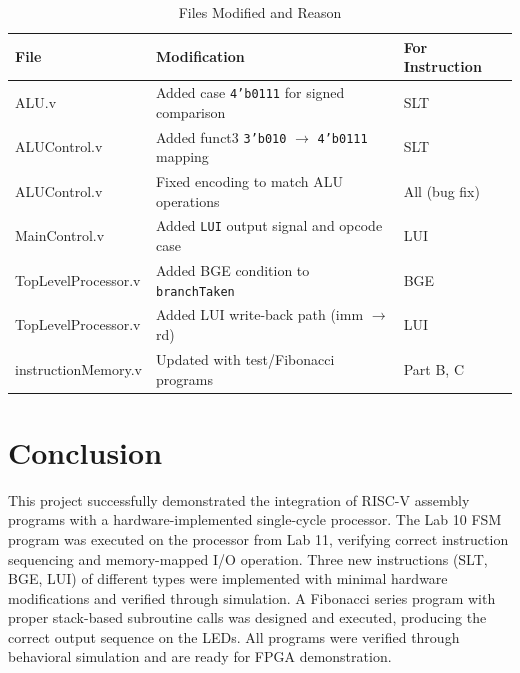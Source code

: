 \documentclass[12pt,a4paper]{article}
\begin{document}
\begin{table}[h]
\centering
\caption{Files Modified and Reason}
\begin{tabular}{@{}lll@{}}
\toprule
\textbf{File} & \textbf{Modification} & \textbf{For Instruction} \\
\midrule
ALU.v              & Added case \texttt{4'b0111} for signed comparison & SLT \\
ALUControl.v       & Added funct3 \texttt{3'b010} $\rightarrow$ \texttt{4'b0111} mapping & SLT \\
ALUControl.v       & Fixed encoding to match ALU operations & All (bug fix) \\
MainControl.v      & Added \texttt{LUI} output signal and opcode case & LUI \\
TopLevelProcessor.v & Added BGE condition to \texttt{branchTaken} & BGE \\
TopLevelProcessor.v & Added LUI write-back path (imm $\rightarrow$ rd) & LUI \\
instructionMemory.v & Updated with test/Fibonacci programs & Part B, C \\
\bottomrule
\end{tabular}
\end{table}

\section{Conclusion}

This project successfully demonstrated the integration of RISC-V assembly programs with a hardware-implemented single-cycle processor. The Lab 10 FSM program was executed on the processor from Lab 11, verifying correct instruction sequencing and memory-mapped I/O operation. Three new instructions (SLT, BGE, LUI) of different types were implemented with minimal hardware modifications and verified through simulation. A Fibonacci series program with proper stack-based subroutine calls was designed and executed, producing the correct output sequence on the LEDs. All programs were verified through behavioral simulation and are ready for FPGA demonstration.
\end{document}
